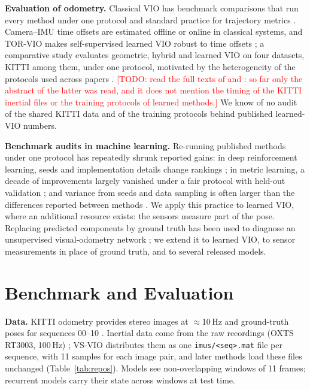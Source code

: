 \documentclass[letterpaper,journal]{IEEEtran}
\newcommand{\todo}[1]{\textcolor{red}{[TODO: #1]}}
\begin{document}
\textbf{Evaluation of odometry.} Classical VIO has benchmark comparisons that run every method under one protocol \cite{Delmerico2018} and standard practice for trajectory metrics \cite{Zhang2018traj}. Camera--IMU time offsets are estimated offline \cite{Furgale2013} or online \cite{Qin2018b} in classical systems, and TOR-VIO makes self-supervised learned VIO robust to time offsets \cite{TORVIO2026}; a comparative study evaluates geometric, hybrid and learned VIO on four datasets, KITTI among them, under one protocol, motivated by the heterogeneity of the protocols used across papers \cite{Gu2026}. \todo{read the full texts of \cite{TORVIO2026} and \cite{Gu2026}: so far only the abstract of the latter was read, and it does not mention the timing of the KITTI inertial files or the training protocols of learned methods.} We know of no audit of the shared KITTI data and of the training protocols behind published learned-VIO numbers.

\textbf{Benchmark audits in machine learning.} Re-running published methods under one protocol has repeatedly shrunk reported gains: in deep reinforcement learning, seeds and implementation details change rankings \cite{Henderson2018}; in metric learning, a decade of improvements largely vanished under a fair protocol with held-out validation \cite{Musgrave2020}; and variance from seeds and data sampling is often larger than the differences reported between methods \cite{Bouthillier2021}. We apply this practice to learned VIO, where an additional resource exists: the sensors measure part of the pose. Replacing predicted components by ground truth has been used to diagnose an unsupervised visual-odometry network \cite{Cimarelli2022}; we extend it to learned VIO, to sensor measurements in place of ground truth, and to several released models.

\section{Benchmark and Evaluation}
\label{sec:bench}

\textbf{Data.} KITTI odometry provides stereo images at $\approx$10\,Hz and ground-truth poses for sequences 00--10 \cite{Geiger2012}. Inertial data come from the raw recordings (OXTS RT3003, 100\,Hz) \cite{Geiger2013}; VS-VIO distributes them as one \texttt{imus/<seq>.mat} file per sequence, with 11 samples for each image pair, and later methods load these files unchanged (Table~\ref{tab:repos}). Models see non-overlapping windows of 11 frames; recurrent models carry their state across windows at test time.
\end{document}
